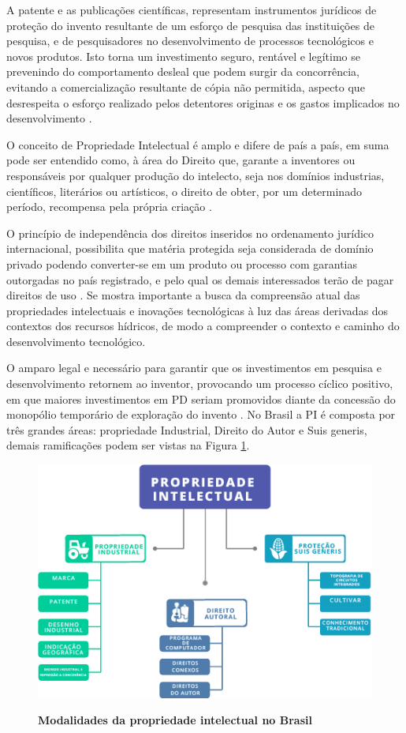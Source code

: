 A patente e as publicações científicas, representam instrumentos jurídicos de proteção do invento resultante de um esforço de pesquisa das instituições de pesquisa, e de pesquisadores no desenvolvimento de processos tecnológicos e novos produtos. Isto torna um investimento seguro, rentável e legítimo se prevenindo do comportamento desleal que podem surgir da concorrência, evitando a comercialização resultante de cópia não permitida, aspecto que desrespeita o esforço realizado pelos detentores originas e os gastos implicados no desenvolvimento \cite{marques_natureza_2017}.

O conceito de Propriedade Intelectual é amplo e difere de país a país, em suma pode ser entendido como, à área do Direito que, garante a inventores ou responsáveis por qualquer produção do intelecto, seja nos domínios industrias, científicos, literários ou artísticos, o direito de obter, por um determinado período, recompensa pela própria criação \cite{aspi_propriedade_2018}.

O princípio de independência dos direitos inseridos no ordenamento jurídico internacional, possibilita que matéria protegida seja considerada de domínio privado podendo converter-se em um produto ou processo com garantias outorgadas no país registrado, e pelo qual os demais interessados terão de pagar direitos de uso \cite{galvao_direitos_2002}. Se mostra importante a busca da compreensão atual das propriedades intelectuais e inovações tecnológicas à luz das áreas derivadas dos contextos dos recursos hídricos, de modo a compreender o contexto e caminho do desenvolvimento tecnológico.

O amparo legal e necessário para garantir que os investimentos em pesquisa e desenvolvimento retornem ao inventor, provocando um processo cíclico positivo, em que maiores investimentos em PD seriam promovidos diante da concessão do monopólio temporário de exploração do invento \cite{lima_sauglobal_2017}. No Brasil a PI é composta por três grandes áreas: propriedade Industrial, Direito do Autor e Suis generis, demais ramificações podem ser vistas na Figura \ref{figura_4}.


\begin{figure}[H]
\centering
\caption{\textbf{Modalidades da propriedade intelectual no Brasil}}
\includegraphics[scale=0.8]{Imagens/propriedade_intelectual.png}
\label{figura_4}
\end{figure}


